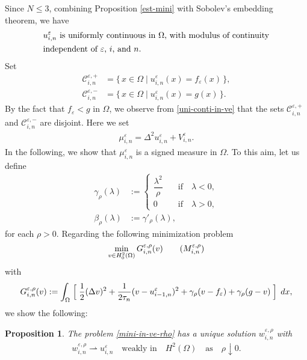 \documentclass[12pt]{amsart}
\newtheorem{prop}{Proposition}[section]
\begin{document}
Since $N \le 3$, combining Proposition \ref{est-mini} with Sobolev's embedding theorem, we have 
\begin{align} \label{uni-conti-in-ve}
&\text{$u^{\varepsilon}_{i,n}$ is uniformly continuous in $\Omega$, with modulus of continuity} \\
&\text{independent of ${\varepsilon}$, $i$, and $n$.} \notag
\end{align}
Set 
\begin{align*}
{\mathcal{C}}^{{\varepsilon}, +}_{i,n} &= \{\, x \in \Omega \mid u^{\varepsilon}_{i,n}(x)= f_{\varepsilon}(x) \,\}, \\
{\mathcal{C}}^{{\varepsilon}, -}_{i,n} &= \{\, x \in \Omega \mid u^{\varepsilon}_{i,n}(x)= g(x) \,\}. 
\end{align*}
By the fact that $f_{\varepsilon} < g$ in $\Omega$, we observe from \eqref{uni-conti-in-ve} that 
the sets ${\mathcal{C}}^{{\varepsilon},+}_{i,n}$ and ${\mathcal{C}}^{{\varepsilon},-}_{i,n}$ are disjoint. Here we set   
\begin{align*}
\mu^{\varepsilon}_{i,n}= \Delta^2 u^{\varepsilon}_{i,n} + V^{\varepsilon}_{i,n}. 
\end{align*}
In the following, we show that $\mu^{\varepsilon}_{i,n}$ is a signed measure in $\Omega$. 
To this aim, let us define 
\begin{align*}
{\gamma}_\rho({\lambda})&:=
\begin{cases}
\dfrac{{\lambda}^2}{\rho} \quad & \text{if} \quad {\lambda} <0, \\
0 \quad & \text{if} \quad {\lambda} >0,
\end{cases}\\
{\beta}_\rho({\lambda}) &:= {\gamma}'_\rho({\lambda}),  
\end{align*}
for each $\rho>0$. Regarding the following minimization problem 
\begin{align} \label{mini-in-ve-rho}
\min_{v \in H^2_0(\Omega)} G^{{\varepsilon},\rho}_{i,n}(v)  \tag{$M^{{\varepsilon},\rho}_{i,n}$}
\end{align}
with 
\begin{align*}
G^{{\varepsilon}, \rho}_{i,n}(v) := \int_\Omega \Bigm[ \dfrac{1}{2}(\Delta v)^2 + \dfrac{1}{2 \tau_n} (v-u^{\varepsilon}_{i-1,n})^2 
                                                                  + {\gamma}_\rho(v-f_{\varepsilon}) + {\gamma}_\rho(g-v) \Bigm] \, dx, 
\end{align*}
we show the following: 
\begin{prop} \label{appro-u-in-ve}
The problem \eqref{mini-in-ve-rho} has a unique solution $w^{{\varepsilon},\rho}_{i,n}$ with 
\begin{align}
w^{{\varepsilon},\rho}_{i,n} \rightharpoonup u^{\varepsilon}_{i,n} \quad \text{weakly in} \quad H^2(\Omega) 
\quad \text{as} \quad \rho \downarrow 0. 
\end{align}
\end{prop}
\end{document}
